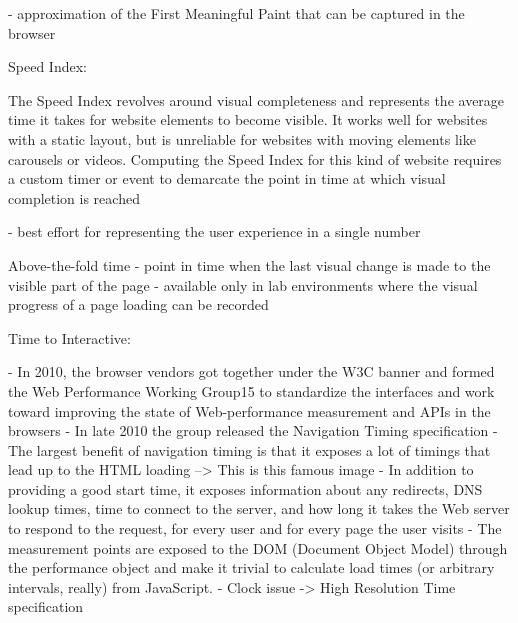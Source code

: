 - approximation of the First Meaningful Paint that can be captured in the browser






Speed Index: %

The Speed Index revolves around visual completeness and represents the average time it takes for website elements to become visible. It works well for websites with a static layout, but is unreliable for websites with moving elements like carousels or videos. Computing the Speed Index for this kind of website requires a custom timer or event to demarcate the point in time at which visual completion is reached

- best effort for representing the user experience in a single number



Above-the-fold time %
- point in time when the last visual change is made to the visible part of the page
- available only in lab environments where the visual progress of a page loading can be recorded





Time to Interactive: %















- In 2010, the browser vendors got together under the W3C banner and formed the Web Performance Working Group15 to standardize the interfaces and work toward improving the state of Web-performance measurement and APIs in the browsers
- In late 2010 the group released the Navigation Timing specification
- The largest benefit of navigation timing is that it exposes a lot of timings that lead up to the HTML loading --> This is this famous image
- In addition to providing a good start time, it exposes information about any redirects, DNS lookup times, time to connect to the server, and how long it takes the Web server to respond to the request, for every user and for every page the user visits
- The measurement points are exposed to the DOM (Document Object Model) through the performance object and make it trivial to calculate load times (or arbitrary intervals, really) from JavaScript.
- Clock issue -> High Resolution Time specification



